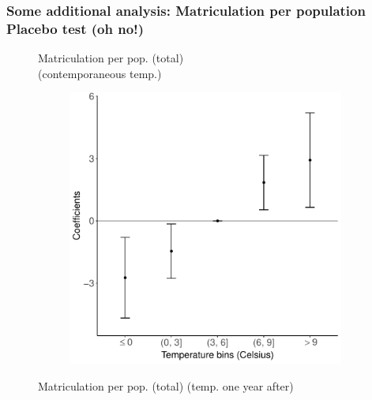 \documentclass[10pt, pdfmx,hiresbb]{beamer}
\begin{document}
\begin{frame}\frametitle{Some additional analysis: Matriculation per population \\ Placebo test (oh no!)}
  \begin{figure}
    \begin{minipage}{0.44\textwidth}
      \begin{center}
        Matriculation per pop. (total) \\ (contemporaneous temp.)
      \end{center}
      \begin{figure}[h]
        \centering
        \includegraphics[width = \textwidth]{../Output/images/per_pop_reg_t.pdf}
      \end{figure}
    \end{minipage}
    \begin{minipage}{0.44\textwidth}
      \begin{center}
        Matriculation per pop. (total) (temp. one year after)
      \end{center}
      \begin{figure}[h]

\end{figure}
\end{minipage}
\end{figure}
\end{frame}
\end{document}
